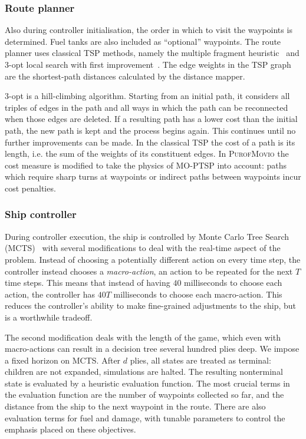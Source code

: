 \documentclass[conference]{IEEEtran}
\begin{document}
\subsubsection{Route planner}
Also during controller initialisation, the order in which to visit the waypoints is determined.
Fuel tanks are also included as ``optional'' waypoints.
The route planner uses classical TSP methods, namely the multiple fragment heuristic~\cite{Bentley1990} and 3-opt local search with first improvement~\cite{Lin1965,Johnson1997}.
The edge weights in the TSP graph are the shortest-path distances calculated by the distance mapper.

3-opt is a hill-climbing algorithm.
Starting from an initial path,
it considers all triples of edges in the path
and all ways in which the path can be reconnected when those edges are deleted.
If a resulting path has a lower cost than the initial path,
the new path is kept and the process begins again.
This continues until no further improvements can be made.
In the classical TSP the cost of a path is its length, i.e. the sum of the weights of its constituent edges.
In \textsc{PurofMovio} the cost measure is modified to take the physics of MO-PTSP into account:
paths which require sharp turns at waypoints or indirect paths between waypoints incur cost penalties.

\subsubsection{Ship controller}
During controller execution,
the ship is controlled by Monte Carlo Tree Search (MCTS)~\cite{MCTSSurvey}
with several modifications to deal with the real-time aspect of the problem.
Instead of choosing a potentially different action on every time step,
the controller instead chooses a \emph{macro-action},
an action to be repeated for the next $T$ time steps.
This means that instead of having $40$ milliseconds to choose each action,
the controller has $40T$ milliseconds to choose each macro-action.
This reduces the controller's ability to make fine-grained adjustments to the ship,
but is a worthwhile tradeoff.

The second modification deals with the length of the game,
which even with macro-actions can result in a decision tree several hundred plies deep.
We impose a fixed horizon on MCTS. After $d$ plies,
all states are treated as terminal: children are not expanded, simulations are halted.
The resulting nonterminal state is evaluated by a heuristic evaluation function.
The most crucial terms in the evaluation function are the number of waypoints collected so far, and the distance from the ship to the next waypoint in the route.
There are also evaluation terms for fuel and damage, with tunable parameters to control the emphasis placed on these objectives.
\end{document}
